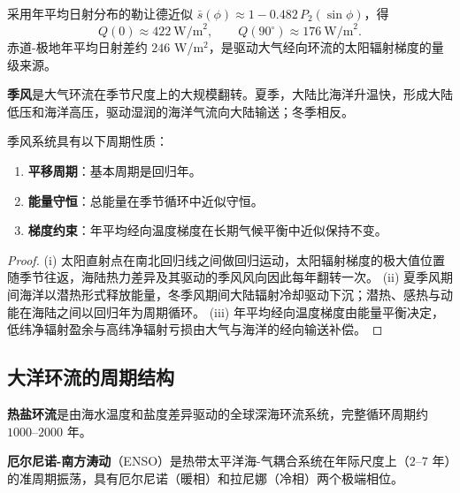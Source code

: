 \begin{example}[太阳辐射经向梯度的具体计算]\label{ch19_insolation_gradient_example}
采用年平均日射分布的勒让德近似 $\bar{s}(\phi)\approx 1-0.482\,P_2(\sin\phi)$，得
\[
Q(0)\approx 422\ \text{W/m}^2,\qquad Q(90^\circ)\approx 176\ \text{W/m}^2.
\]
赤道-极地年平均日射差约 $246$ W/m$^2$，是驱动大气经向环流的太阳辐射梯度的量级来源。
\end{example}

\begin{definition}[季风系统]\label{def:monsoon_system}
\textbf{季风}是大气环流在季节尺度上的大规模翻转。夏季，大陆比海洋升温快，形成大陆低压和海洋高压，驱动湿润的海洋气流向大陆输送；冬季相反。
\end{definition}

\begin{proposition}[季风系统的周期性质]\label{prop:monsoon_periodicity}
季风系统具有以下周期性质：
\begin{enumerate}[label=(\roman*)]
    \item \textbf{平移周期}：基本周期是回归年。
    \item \textbf{能量守恒}：总能量在季节循环中近似守恒。
    \item \textbf{梯度约束}：年平均经向温度梯度在长期气候平衡中近似保持不变。
\end{enumerate}
\end{proposition}

\begin{proof}
(i) 太阳直射点在南北回归线之间做回归运动，太阳辐射梯度的极大值位置随季节往返，海陆热力差异及其驱动的季风风向因此每年翻转一次。
(ii) 夏季风期间海洋以潜热形式释放能量，冬季风期间大陆辐射冷却驱动下沉；潜热、感热与动能在海陆之间以回归年为周期循环。
(iii) 年平均经向温度梯度由能量平衡决定，低纬净辐射盈余与高纬净辐射亏损由大气与海洋的经向输送补偿。
\end{proof}

\subsection{大洋环流的周期结构}

\begin{definition}[热盐环流]\label{def:thermohaline_circulation}
\textbf{热盐环流}是由海水温度和盐度差异驱动的全球深海环流系统，完整循环周期约 $1000$--$2000$ 年。
\end{definition}

\begin{definition}\label{def:enso_geo}
\textbf{厄尔尼诺-南方涛动}（ENSO）是热带太平洋海-气耦合系统在年际尺度上（$2$--$7$ 年）的准周期振荡，具有厄尔尼诺（暖相）和拉尼娜（冷相）两个极端相位。
\end{definition}

